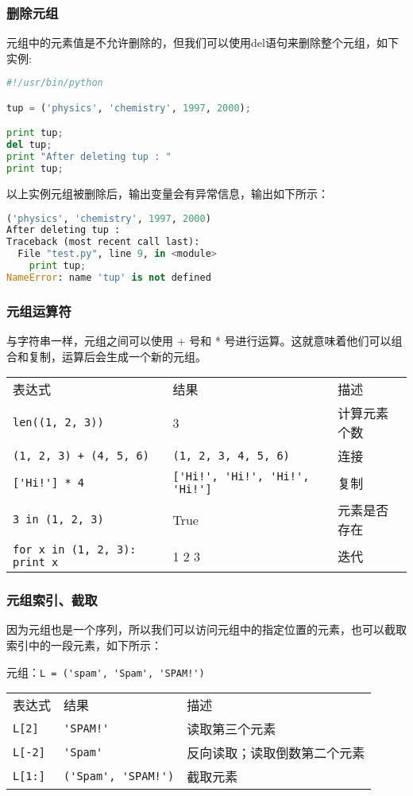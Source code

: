 \subsubsection{删除元组}
元组中的元素值是不允许删除的，但我们可以使用del语句来删除整个元组，如下实例:
\begin{lstlisting}[language=Python]
#!/usr/bin/python

tup = ('physics', 'chemistry', 1997, 2000);

print tup;
del tup;
print "After deleting tup : "
print tup;
\end{lstlisting}
以上实例元组被删除后，输出变量会有异常信息，输出如下所示：
\begin{lstlisting}[language=Python]
('physics', 'chemistry', 1997, 2000)
After deleting tup :
Traceback (most recent call last):
  File "test.py", line 9, in <module>
    print tup;
NameError: name 'tup' is not defined
\end{lstlisting}


\subsubsection{元组运算符}
与字符串一样，元组之间可以使用 + 号和 * 号进行运算。这就意味着他们可以组合和复制，运算后会生成一个新的元组。

\begin{tabular}{l|l|l}
表达式&	结果&	描述\\
\verb|len((1, 2, 3))|&	3	&计算元素个数\\
\verb|(1, 2, 3) + (4, 5, 6)|	&\verb|(1, 2, 3, 4, 5, 6)|&	连接\\
\verb|['Hi!'] * 4|	&\verb|['Hi!', 'Hi!', 'Hi!', 'Hi!']| &	复制\\
\verb|3 in (1, 2, 3)|&	True&	元素是否存在\\
\verb|for x in (1, 2, 3): print x| &	1 2 3	&迭代
\end{tabular}


\subsubsection{元组索引、截取}
因为元组也是一个序列，所以我们可以访问元组中的指定位置的元素，也可以截取索引中的一段元素，如下所示：

元组：\verb|L = ('spam', 'Spam', 'SPAM!')|

\begin{tabular}{l|l|l}
 表达式 & 	结果&	描述\\
\verb|L[2]| &	\verb|'SPAM!'| &	读取第三个元素\\
\verb|L[-2]| &	\verb|'Spam'|	 &反向读取；读取倒数第二个元素\\
\verb|L[1:]| &	\verb|('Spam', 'SPAM!')| &	截取元素
\end{tabular}


